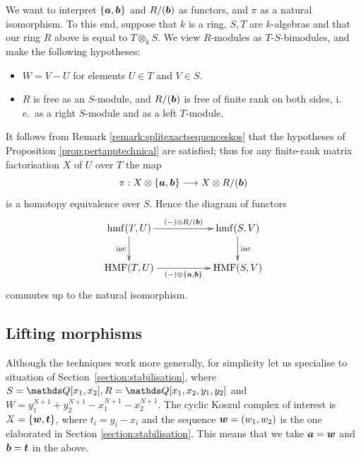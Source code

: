 \documentclass{compositio}
\theoremstyle{definition}
\numberwithin{equation}{section}
\def\inc{\operatorname{inc}}
\DeclareMathOperator{\hmf}{hmf}
\DeclareMathOperator{\HMF}{HMF}
\begin{document}
We want to interpret $\{ \boldsymbol{a}, \boldsymbol{b} \}$ and $R/(\boldsymbol{b})$ as functors, and $\pi$ as a natural isomorphism. To this end, suppose that $k$ is a ring, $S,T$ are $k$-algebras and that our ring $R$ above is equal to $T \otimes_k S$. We view $R$-modules as $T$-$S$-bimodules, and make the following hypotheses:
\begin{itemize}
\item $W = V - U$ for elements $U \in T$ and $V \in S$.
\item $R$ is free as an $S$-module, and $R/(\boldsymbol{b})$ is free of finite rank on both sides, i.\,e.~as a right $S$-module and as a left $T$-module.
\end{itemize}
It follows from Remark \ref{remark:splitexactsequenceskos} that the hypotheses of Proposition \ref{prop:pertapptechnical} are satisfied; thus for any finite-rank matrix factorisation $X$ of $U$ over $T$ the map
\[
\pi: X \otimes \{ \boldsymbol{a}, \boldsymbol{b} \} \longrightarrow X \otimes R/(\boldsymbol{b})
\]
is a homotopy equivalence over $S$. Hence the diagram of functors
\[
\xymatrix@C+2.5pc{
\hmf(T, U) \ar[d]_-{\inc}\ar[r]^-{(-) \otimes R/(\bb)} & \hmf(S,V) \ar[d]^-{\inc}\\
\HMF(T, U) \ar[r]_-{(-) \otimes \{ \bs{a}, \bs{b} \}} & \HMF(S,V)
}
\]
commutes up to the natural isomorphism.

\subsection{Lifting morphisms}\label{subsection:liftingmorphisms}

Although the techniques work more generally, for simplicity let us specialise to situation of Section~\ref{section:stabilisation}, where $S = \QQ[x_1, x_2], R = \QQ[x_1,x_2,y_1,y_2]$ and $W = y_1^{N+1} + y_2^{N+1} - x_1^{N+1} - x_2^{N+1}$. The cyclic Koszul complex of interest is $\Xcirc = \{ \bs{w}, \bs{t} \}$, where $t_i = y_i - x_i$ and the sequence $\boldsymbol{w} = (w_1,w_2)$ is the one elaborated in Section \ref{section:stabilisation}. This means that we take $\boldsymbol{a}=\boldsymbol{w}$ and $\boldsymbol{b} = \boldsymbol{t}$ in the above. 
\end{document}
